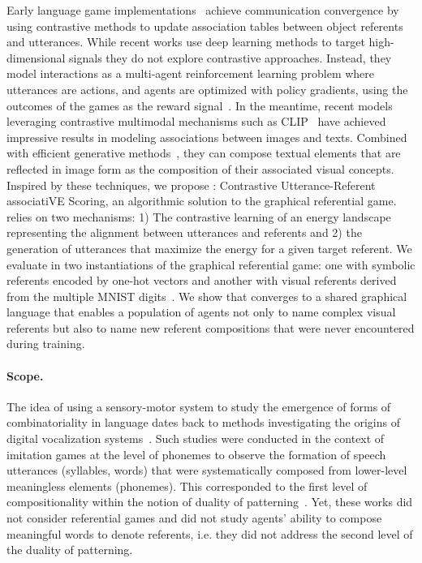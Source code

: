 Early language game implementations~\citep{steels1995selforganizing,steels2001language} achieve communication convergence by using contrastive methods to update association tables between object referents and utterances. While recent works use deep learning methods to target high-dimensional signals they do not explore contrastive approaches. Instead, they model interactions as a multi-agent reinforcement learning problem where utterances are actions, and agents are optimized with policy gradients, using the outcomes of the games as the reward signal~\citep{lazaridou2017multiagent}. In the meantime, recent models leveraging contrastive multimodal mechanisms such as CLIP~\citep{radford2021learning} have achieved impressive results in modeling associations between images and texts. Combined with efficient generative methods~\citep{ramesh2021zero-shot}, they can compose textual elements that are reflected in image form as the composition of their associated visual concepts. Inspired by these techniques, we propose \curves: Contrastive Utterance-Referent associatiVE Scoring, an algorithmic solution to the graphical referential game. \curves relies on two mechanisms: 1) The contrastive learning of an energy landscape representing the alignment between utterances and referents and 2) the generation of utterances that maximize the energy for a given target referent. We evaluate \curves in two instantiations of the graphical referential game: one with symbolic referents encoded by one-hot vectors and another with visual referents derived from the multiple MNIST digits~\citep{LeCun1998GradientbasedLA}. We show that \curves converges to a shared graphical language that enables a population of agents not only to name complex visual referents but also to name new referent compositions that were never encountered during training.

\paragraph{Scope.} The idea of using a sensory-motor system to study the emergence of forms of combinatoriality in language dates back to methods investigating the origins of digital vocalization systems~\citep{deBoer2000selforganization,oudeyer2005selforganization,zuidema2009evolution}. Such studies were conducted in the context of imitation games at the level of phonemes to observe the formation of speech utterances (syllables, words) that were systematically composed from lower-level meaningless elements (phonemes). This corresponded to the first level of compositionality within the notion of duality of patterning~\citep{hockett1960origin}. Yet, these works did not consider referential games and did not study agents' ability to compose meaningful words to denote referents, i.e. they did not address the second level of the duality of patterning. 

